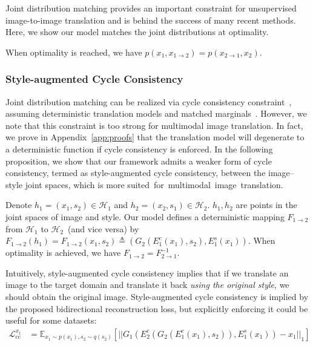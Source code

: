 \documentclass[runningheads]{llncs}
\begin{document}
	Joint distribution matching provides an important constraint for unsupervised image-to-image translation and is behind the success of many recent methods. Here, we show our model matches the joint distributions at optimality.
	\begin{proposition}
		When optimality is reached,  we have
		$p(x_{1}, x_{1\rightarrow 2}) = p(x_{2\rightarrow 1}, x_{2})$.
	\end{proposition}
	
	\subsubsection{Style-augmented Cycle Consistency} Joint distribution matching can be realized via cycle consistency constraint~\cite{zhu2017unpaired}, assuming deterministic translation models and matched marginals~\cite{li2017alice,donahue2017adversarial,dumoulin2017adversarially}. However, we note that this constraint is too strong for multimodal image translation. In fact, we prove in Appendix~\ref{app:proofs} that the translation model will degenerate to a deterministic function if cycle consistency is enforced. In the following proposition, we show that our framework admits a weaker form of cycle consistency, termed as style-augmented cycle consistency, between the image--style joint spaces, which is more \mbox{suited for multimodal image translation.}
	
	
	\begin{proposition}
		Denote $h_{1}=(x_{1}, s_{2})\in \mathcal{H}_{1}$ and $h_{2}=(x_{2}, s_{1})\in \mathcal{H}_{2}$. $h_{1}, h_{2}$ are points in the joint spaces of image and style. Our model defines a deterministic mapping $F_{1\rightarrow 2}$ from $\mathcal{H}_{1}$ to $\mathcal{H}_{2}$~(and vice versa) by $F_{1\rightarrow 2}(h_{1}) = F_{1\rightarrow 2}(x_{1}, s_{2})\triangleq(G_{2}(E^{c}_{1}(x_{1}), s_{2}), E^{s}_{1}(x_{1}))$. When optimality is achieved, we have $F_{1\rightarrow 2} = F_{2\rightarrow 1}^{-1}$.
	\end{proposition}
	
	Intuitively, style-augmented cycle consistency implies that if we translate an image to the target domain and translate it back \textit{using the original style}, we should obtain the original image. Style-augmented cycle consistency is implied by the proposed bidirectional reconstruction loss, but explicitly enforcing it could be useful for some datasets:
	\begin{align}
	\mathcal{L}^{x_{1}}_{\text{cc}}&=\mathbb{E}_{x_{1}\sim p(x_{1}), s_{2}\sim q(s_{2})}[||G_{1}(E_{2}^{c}(G_{2}(E_{1}^{c}(x_{1}), s_{2})), E_{1}^{s}(x_{1}))-x_{1}||_{1}]
	\end{align}
\end{document}
